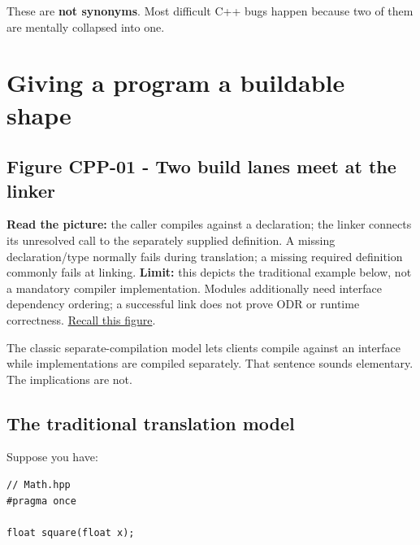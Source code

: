 These are \textbf{not synonyms}. Most difficult C++ bugs happen because two of them are mentally collapsed into one.

\section{Giving a program a buildable shape}\label{05-engine-i-ch002-giving-a-program-a-buildable-shape}

\hypertarget{05-engine-i-ch002-giving-a-program-a-buildable-shape}{}

\subsection{Figure CPP-01 - Two build lanes meet at the linker}\label{05-engine-i-ch002-figure-cpp-01---two-build-lanes-meet-at-the-linker}

\hypertarget{05-engine-i-ch002-figure-cpp-01---two-build-lanes-meet-at-the-linker}{}


\textbf{Read the picture:} the caller compiles against a declaration; the linker connects its unresolved call to the separately supplied definition. A missing declaration/type normally fails during translation; a missing required definition commonly fails at linking. \textbf{Limit:} this depicts the traditional example below, not a mandatory compiler implementation. Modules additionally need interface dependency ordering; a successful link does not prove ODR or runtime correctness. \hyperref[appendix-960160274237-four-figure-briefs]{Recall this figure}.

The classic separate-compilation model lets clients compile against an interface while implementations are compiled separately. That sentence sounds elementary. The implications are not.

\subsection{The traditional translation model}\label{05-engine-i-ch002-the-traditional-translation-model}

\hypertarget{05-engine-i-ch002-the-traditional-translation-model}{}

Suppose you have:

\begin{verbatim}
// Math.hpp
#pragma once

float square(float x);
\end{verbatim}

